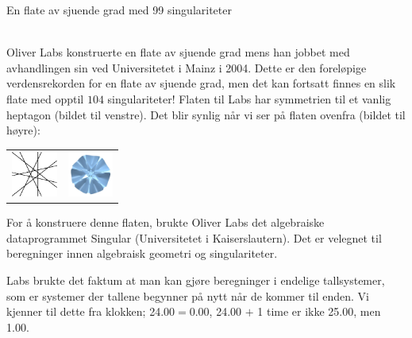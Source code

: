 \documentclass[no]{./../../common/SurferDesc}%
\begin{document}
\footnotesize


\begin{surferPage}
  \begin{surferTitle}En flate av sjuende grad med 99 singulariteter\end{surferTitle}   \\
  
	Oliver Labs konstruerte en flate av sjuende grad mens han jobbet med avhandlingen sin 
	ved Universitetet i Mainz i 2004. Dette er den foreløpige verdensrekorden for en flate av sjuende 
	grad, men det kan fortsatt finnes en slik flate med opptil $104$ singulariteter! Flaten til Labs har 
	symmetrien til et vanlig heptagon (bildet til venstre). Det blir synlig når vi ser på flaten ovenfra (bildet til høyre):
	
    \vspace*{-0.3em}
    \begin{center}
      \begin{tabular}{c@{\qquad}c}
        \includegraphics[height=1.5cm]{./../../common/images/labsseptic1.pdf}
        &
        \includegraphics[height=1.5cm]{./../../common/images/labs_septic_von_oben}
      \end{tabular}
    \end{center}
    \vspace*{-0.3em}
	
	For å konstruere denne flaten, brukte Oliver Labs det algebraiske dataprogrammet {\sc Singular} 
	(Universitetet i Kaiserslautern). Det er velegnet til beregninger innen algebraisk geometri og singulariteter. 

	Labs brukte det faktum at man kan gjøre beregninger i endelige tallsystemer, som er systemer der tallene begynner 
	på nytt når de kommer til enden. Vi kjenner til dette fra klokken; 24.00$=$0.00, 24.00 $+$ 1 time er ikke 25.00, men 1.00.
	

     
\end{surferPage}
\end{document}
